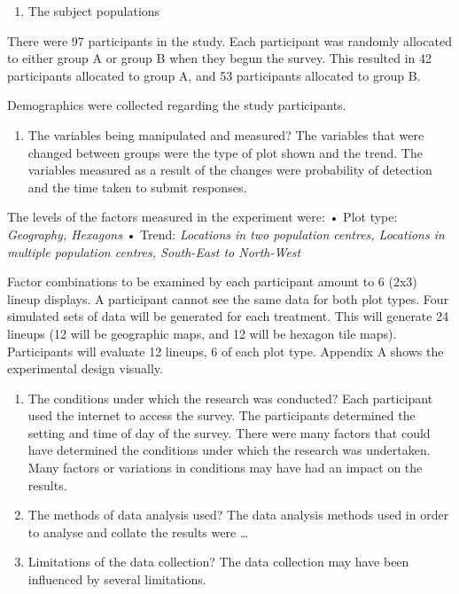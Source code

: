 \documentclass[conference,final,]{IEEEtran}
\providecommand{\tightlist}{%
  \setlength{\itemsep}{0pt}\setlength{\parskip}{0pt}}
\begin{document}
\begin{enumerate}
\def\labelenumi{\arabic{enumi}.}
\setcounter{enumi}{1}
\tightlist
\item
  The subject populations 
\end{enumerate}

There were 97 participants in the study. Each participant was randomly
allocated to either group A or group B when they begun the survey. This
resulted in 42 participants allocated to group A, and 53 participants
allocated to group B.

Demographics were collected regarding the study participants.

\begin{enumerate}
\def\labelenumi{\arabic{enumi}.}
\setcounter{enumi}{2}
\tightlist
\item
  The variables being manipulated and measured? The variables that were
  changed between groups were the type of plot shown and the trend. The
  variables measured as a result of the changes were probability of
  detection and the time taken to submit responses.
\end{enumerate}

The levels of the factors measured in the experiment were: • Plot type:
\emph{Geography, Hexagons} • Trend: \emph{Locations in two population
centres, Locations in multiple population centres, South-East to
North-West}

Factor combinations to be examined by each participant amount to 6 (2x3)
lineup displays. A participant cannot see the same data for both plot
types. Four simulated sets of data will be generated for each treatment.
This will generate 24 lineups (12 will be geographic maps, and 12 will
be hexagon tile maps). Participants will evaluate 12 lineups, 6 of each
plot type. Appendix A shows the experimental design visually.

\begin{enumerate}
\def\labelenumi{\arabic{enumi}.}
\setcounter{enumi}{3}
\item
  The conditions under which the research was conducted? Each
  participant used the internet to access the survey. The participants
  determined the setting and time of day of the survey. There were many
  factors that could have determined the conditions under which the
  research was undertaken. Many factors or variations in conditions may
  have had an impact on the results.
\item
  The methods of data analysis used? The data analysis methods used in
  order to analyse and collate the results were \ldots{}
\item
  Limitations of the data collection? The data collection may have been
  influenced by several limitations.
\end{enumerate}
\end{document}
